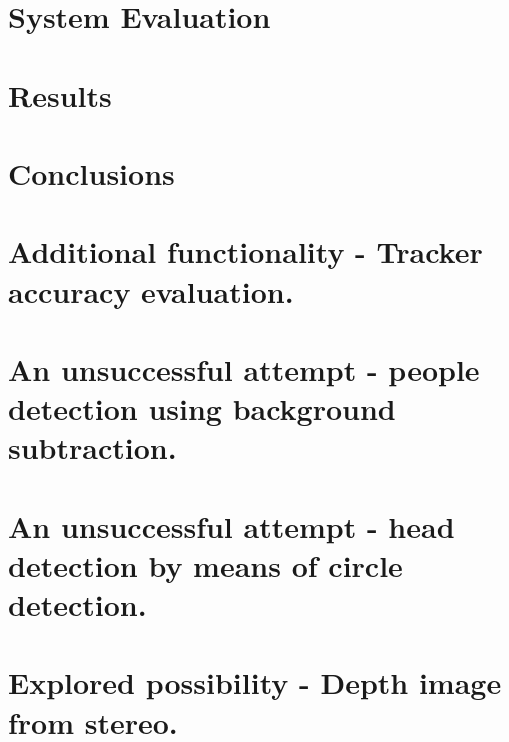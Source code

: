 \documentclass[10pt, a4paper, twoside]{article}
\numberwithin{equation}{subsection}
\numberwithin{figure}{section}
\numberwithin{table}{section}
\begin{document}
\newpage
\section{System Evaluation}
\label{sec:evaluation}


\newpage
\section{Results}
\label{sec:results}


\newpage
\section{Conclusions}
\label{sec:conclusions}


\newpage
\appendix
{} %

\section{Additional functionality - Tracker accuracy evaluation.}
\label{sec:tracker_evaluation}

\newpage

\section{An unsuccessful attempt - people detection using background subtraction.}
\label{sec:bg_subtraction}

\newpage

\section{An unsuccessful attempt - head detection by means of circle detection.}
\label{sec:hough_circles}

\newpage

\section{Explored possibility - Depth image from stereo.}
\label{sec:stereoBM}

\newpage

%
%

\thispagestyle{fancy}
\mbox{}

\end{document}
